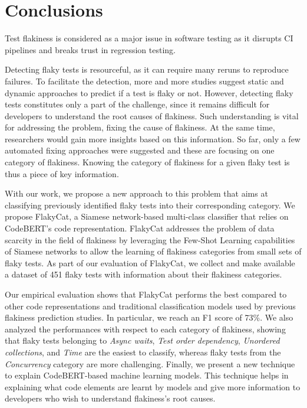 \section{Conclusions}
\label{sec:flakycat-conclusion}

Test flakiness is considered as a major issue in software testing as it disrupts CI pipelines and breaks trust in regression testing.

Detecting flaky tests is resourceful, as it can require many reruns to reproduce failures. To facilitate the detection, more and more studies suggest static and dynamic approaches to predict if a test is flaky or not.
However, detecting flaky tests constitutes only a part of the challenge, since it remains difficult for developers to understand the root causes of flakiness. Such understanding is vital for addressing the problem, \ie fixing the cause of flakiness. At the same time, researchers would gain more insights based on this information. So far, only a few automated fixing approaches were suggested and these are focusing on one category of flakiness. Knowing the category of flakiness for a given flaky test is thus a piece of key information. 

With our work, we propose a new approach to this problem that aims at classifying previously identified flaky tests into their corresponding category. We propose FlakyCat, a Siamese network-based multi-class classifier that relies on CodeBERT's code representation. FlakyCat addresses the problem of data scarcity in the field of flakiness by leveraging the Few-Shot Learning capabilities of Siamese networks to allow the learning of flakiness categories from small sets of flaky tests. As part of our evaluation of FlakyCat, we collect and make available a dataset of 451 flaky tests with information about their flakiness categories. 

Our empirical evaluation shows that FlakyCat performs the best compared to other code representations and traditional classification models used by previous flakiness prediction studies. In particular, we reach an F1 score of 73\%. We also analyzed the performances with respect to each category of flakiness, showing that flaky tests belonging to \textit{Async waits}, \textit{Test order dependency}, \textit{Unordered collections}, and \textit{Time} are the easiest to classify, whereas flaky tests from the \textit{Concurrency} category are more challenging. Finally, we present a new technique to explain CodeBERT-based machine learning models. This technique helps in explaining what code elements are learnt by models and give more information to developers who wish to understand flakiness's root causes. 